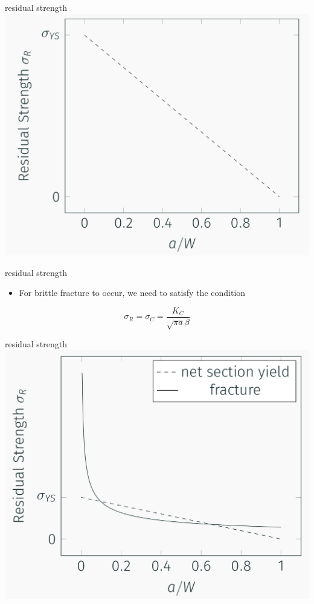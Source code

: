 \documentclass[
  letterpaper,
  ignorenonframetext,
  aspectratio=43,
  handout,
  12pt]{beamer}
\providecommand{\tightlist}{%
  \setlength{\itemsep}{0pt}\setlength{\parskip}{0pt}}
\providecommand{\tightlist}{%
\setlength{\itemsep}{0pt}\setlength{\parskip}{0pt}}
\let\Oldincludegraphics\includegraphics
\renewcommand{\includegraphics}[2][]{\Oldincludegraphics[width=\textwidth,height=0.7\textheight,keepaspectratio]{#2}}
\begin{document}
\begin{frame}{residual strength}
\protect\hypertarget{residual-strength-2}{}
\includegraphics{../images/residual-strength.PNG}
\end{frame}

\begin{frame}{residual strength}
\protect\hypertarget{residual-strength-3}{}
\begin{itemize}
\tightlist
\item
  For brittle fracture to occur, we need to satisfy the condition
\end{itemize}

\[\sigma_R = \sigma_C = \frac{K_C}{\sqrt{\pi a}\beta}\]
\end{frame}

\begin{frame}{residual strength}
\protect\hypertarget{residual-strength-4}{}
\includegraphics{../images/residual-tough.PNG}
\end{frame}
\end{document}
